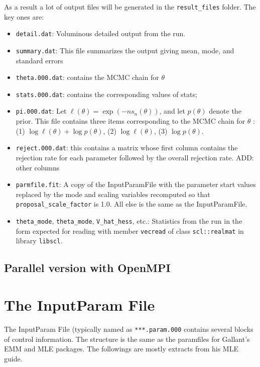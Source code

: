 \documentclass[11pt, letterpaper, notitlepage]{article}
\begin{document}
As a result a lot of output files will be generated in the \texttt{result\_files} folder. The key ones are:
\begin{itemize}
\item \texttt{detail.dat}: Voluminous detailed output from the run.
\item \texttt{summary.dat}: This file summarizes the output giving mean, mode, and standard errors
\item \texttt{theta.000.dat}: contains
the MCMC chain for $\theta$ 
\item \texttt{stats.000.dat}: contains the corresponding values of stats;
\item \texttt{pi.000.dat}: Let $\ell(\theta) = \exp(-n s_n(\theta))$, and let $p(\theta)$ denote the prior. This file contains three items corresponding to the MCMC chain for $\theta$ :
(1) $\log \ell(\theta) + \log p(\theta)$, (2) $\log \ell(\theta)$, (3) $\log p(\theta)$.
\item \texttt{reject.000.dat}: this contains a matrix whose first column contains the rejection rate for each parameter followed by the overall rejection rate. ADD: other columns
\item \texttt{parmfile.fit}: A copy of the InputParamFile with the parameter start values replaced by the mode and scaling variables recomputed so that \texttt{proposal\_scale\_factor} is 1.0. All else is the same as the InputParamFile.
\item \texttt{theta\_mode}, \texttt{theta\_mode}, \texttt{V\_hat\_hess}, etc.: Statistics from the run in the form expected for reading with member \texttt{vecread} of class \texttt{scl::realmat} in library \texttt{libscl}.
\end{itemize}

\subsection{Parallel version with OpenMPI}

\pagebreak 

\section{The InputParam File}

The InputParam File (typically named as \texttt{***.param.000} contains several blocks of control information. The structure is the same as the paramfiles for Gallant's EMM and MLE packages. The followings are mostly extracts from his MLE guide.
\end{document}
